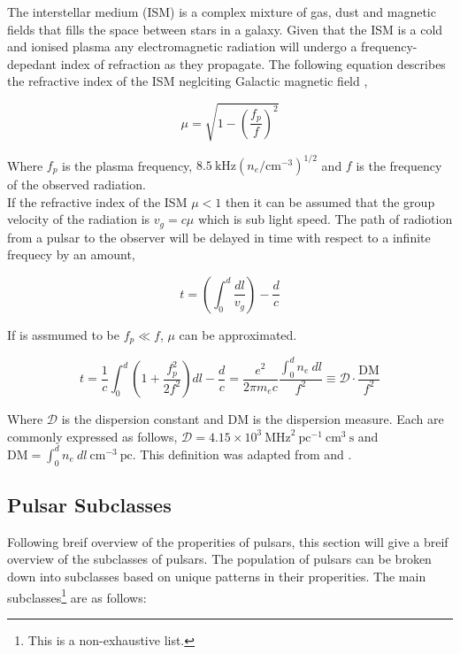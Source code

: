 The interstellar medium (ISM) is a complex mixture of gas, dust and magnetic fields that fills the space between stars in a galaxy. Given that the ISM is a cold and ionised plasma any electromagnetic radiation will undergo a frequency-depedant index of refraction as they propagate. The following equation describes the refractive index of the ISM neglciting Galactic magnetic field \citep[p.~85]{pulsar_handbook},

\begin{equation}
    \mu = \sqrt{1 - \left( \frac{f_p}{f} \right)^2}
    \label{eq: ism-refractive-index}
\end{equation}

Where $f_p$ is the plasma frequency, $8.5 ~\text{kHz} \left(n_e/\text{cm}^{-3} \right)^{1/2}$ and $f$ is the frequency of the observed radiation. \\ If the refractive index of the ISM $\mu < 1$ then it can be assumed that the group velocity of the radiation is $v_g = c\mu$ which is sub light speed. The path of radiotion from a pulsar to the observer will be delayed in time with respect to a infinite frequecy by an amount, 

\begin{equation}
    t = \left( \int^d_0 \frac{dl}{v_g} \right) - \frac{d}{c}
\end{equation}

If is assmumed to be $f_p \ll f$, $\mu$ can be approximated.

\begin{equation}
    t = \frac{1}{c} \int^d_0 \left(1 + \frac{f_p^2}{2f^2} \right) dl - \frac{d}{c}  = \frac{e^2}{2 \pi m_e c} \dfrac{\int^d_0 n_e ~dl}{f^2} \equiv \mathcal{D} \cdot \dfrac{\text{DM}}{f^2}
\end{equation}

Where $\mathcal{D}$ is the dispersion constant and $\text{DM}$ is the dispersion measure. Each are commonly expressed as follows, $\mathcal{D}= 4.15 \times 10^3 ~\text{MHz}^2 ~\text{pc}^{-1} ~ \text{cm}^3 ~\text{s}$ and $\text{DM} = \int^d_0 n_e ~dl ~\text{cm}^{-3} ~\text{pc}$. This definition was adapted from \citet[p.~86]{pulsar_handbook} and \cite{taylor_recent_1977}.

\subsection{Pulsar Subclasses}
Following breif overview of the properities of pulsars, this section will give a breif overview of the subclasses of pulsars. The population of pulsars can be broken down into subclasses based on unique patterns in their properities. The main subclasses\footnote{This is a non-exhaustive list.} are as follows:

